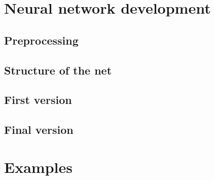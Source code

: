 \documentclass{beamer}
\begin{document}
\section{Neural network development}

\subsection{Preprocessing}

\subsection{Structure of the net}

\subsection{First version}

\subsection{Final version}

\section{Examples}
\end{document}
